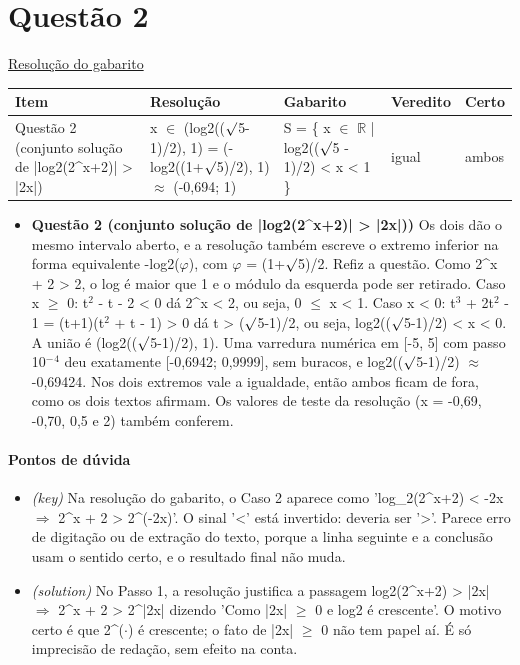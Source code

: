 \documentclass{article}%
\begin{document}
\section*{Questão 2}%
\href{https://poliedroresolve.sistemapoliedro.com.br/vestibulares/ita/2027/ita-2-fase-dia-1-20-10-2026-2-fase-dia-1/dissertativa-2-matematica-2-fase-dia-1-ita-2027}{Resolução do gabarito}\par\smallskip%
\begin{longtable}{@{}p{} p{} p{} p{} p{}@{}}\toprule Item & Resolução & Gabarito & Veredito & Certo \\ \midrule
Questão 2 (conjunto solução de |log2(2\^{}x+2)| > |2x|) & x $\in$ (log2(($\surd$5-1)/2), 1) = (-log2((1+$\surd$5)/2), 1) $\approx$ (-0,694; 1) & S = \{ x $\in$ $\mathbb{R}$ | log2(($\surd$5 - 1)/2) < x < 1 \} & igual & ambos \\
\bottomrule\end{longtable}%
\begin{itemize}%
\item%
\textbf{Questão 2 (conjunto solução de |log2(2\^{}x+2)| > |2x|))} Os dois dão o mesmo intervalo aberto, e a resolução também escreve o extremo inferior na forma equivalente -log2($\varphi$), com $\varphi$ = (1+$\surd$5)/2. Refiz a questão. Como 2\^{}x + 2 > 2, o log é maior que 1 e o módulo da esquerda pode ser retirado. Caso x $\geq$ 0: t$^2$ - t - 2 < 0 dá 2\^{}x < 2, ou seja, 0 $\leq$ x < 1. Caso x < 0: t$^3$ + 2t$^2$ - 1 = (t+1)(t$^2$ + t - 1) > 0 dá t > ($\surd$5-1)/2, ou seja, log2(($\surd$5-1)/2) < x < 0. A união é (log2(($\surd$5-1)/2), 1). Uma varredura numérica em {[}-5, 5{]} com passo 10$^{-}$$^{4}$ deu exatamente {[}-0,6942; 0,9999{]}, sem buracos, e log2(($\surd$5-1)/2) $\approx$ -0,69424. Nos dois extremos vale a igualdade, então ambos ficam de fora, como os dois textos afirmam. Os valores de teste da resolução (x = -0,69, -0,70, 0,5 e 2) também conferem.%
\end{itemize}%
\paragraph{Pontos de dúvida}%
\begin{itemize}%
\item%
\textit{(key)} Na resolução do gabarito, o Caso 2 aparece como 'log\_2(2\^{}x+2) < -2x $\Rightarrow$ 2\^{}x + 2 > 2\^{}(-2x)'. O sinal '<' está invertido: deveria ser '>'. Parece erro de digitação ou de extração do texto, porque a linha seguinte e a conclusão usam o sentido certo, e o resultado final não muda.%
\item%
\textit{(solution)} No Passo 1, a resolução justifica a passagem log2(2\^{}x+2) > |2x| $\Rightarrow$ 2\^{}x + 2 > 2\^{}|2x| dizendo 'Como |2x| $\geq$ 0 e log2 é crescente'. O motivo certo é que 2\^{}($\cdot$) é crescente; o fato de |2x| $\geq$ 0 não tem papel aí. É só imprecisão de redação, sem efeito na conta.%
\end{itemize}%
\end{document}
